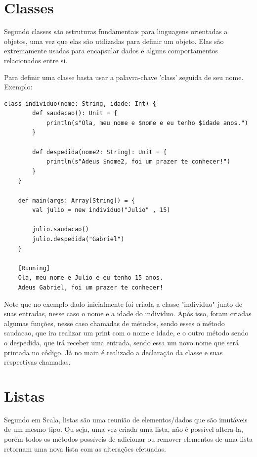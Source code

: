 		\section{Classes}
	
	Segundo \cite{Sfregola2021} classes são estruturas fundamentais para linguagens orientadas a objetos, uma vez que elas são utilizadas para definir um objeto. Elas são extremamente usadas para encapsular dados e alguns comportamentos relacionados entre si.
	
	Para definir uma classe basta usar a palavra-chave 'class' seguida de seu nome.
	Exemplo:
	
	\begin{lstlisting}[breaklines]
	class individuo(nome: String, idade: Int) {
		def saudacao(): Unit = {
			println(s"Ola, meu nome e $nome e eu tenho $idade anos.")
		}
			
		def despedida(nome2: String): Unit = {
			println(s"Adeus $nome2, foi um prazer te conhecer!")
		}
	}
		
	def main(args: Array[String]) = {
		val julio = new individuo("Julio" , 15)
			
		julio.saudacao()
		julio.despedida("Gabriel")
	}
		
	[Running]
	Ola, meu nome e Julio e eu tenho 15 anos.
	Adeus Gabriel, foi um prazer te conhecer!
	\end{lstlisting}

	Note que no exemplo dado inicialmente foi criada a classe "individuo" junto de suas entradas, nesse caso o nome e a idade do individuo. Após isso, foram criadas algumas funções, nesse caso chamadas de métodos, sendo esses o método saudacao, que ira realizar um print com o nome e idade, e o outro método sendo o despedida, que irá receber uma entrada, sendo essa um novo nome que será printada no código. Já no main é realizado a declaração da classe e suas respectivas chamadas.

    \section{Listas}

	Segundo \cite{Sfregola2021} em Scala, listas são uma reunião de elementos/dados que são imutáveis de um mesmo tipo. Ou seja, uma vez criada uma lista, não é possível altera-la, porém todos os métodos possíveis de adicionar ou remover elementos de uma lista retornam uma nova lista com as alterações efetuadas.
	
